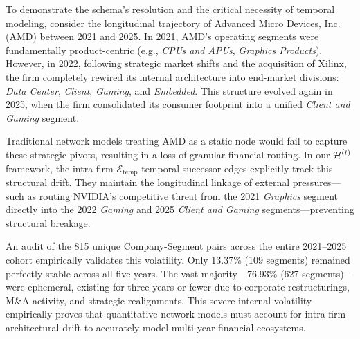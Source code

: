 To demonstrate the schema's resolution and the critical necessity of temporal modeling, consider the longitudinal trajectory of Advanced Micro Devices, Inc. (AMD) between 2021 and 2025. In 2021, AMD's operating segments were fundamentally product-centric (e.g., \textit{CPUs and APUs}, \textit{Graphics Products}). However, in 2022, following strategic market shifts and the acquisition of Xilinx, the firm completely rewired its internal architecture into end-market divisions: \textit{Data Center}, \textit{Client}, \textit{Gaming}, and \textit{Embedded}. This structure evolved again in 2025, when the firm consolidated its consumer footprint into a unified \textit{Client and Gaming} segment.

Traditional network models treating AMD as a static node would fail to capture these strategic pivots, resulting in a loss of granular financial routing. In our $\mathcal{H}^{(t)}$ framework, the intra-firm $\mathcal{E}_{\text{temp}}$ temporal successor edges explicitly track this structural drift. They maintain the longitudinal linkage of external pressures—such as routing NVIDIA's competitive threat from the 2021 \textit{Graphics} segment directly into the 2022 \textit{Gaming} and 2025 \textit{Client and Gaming} segments—preventing structural breakage. 

An audit of the 815 unique Company-Segment pairs across the entire 2021--2025 cohort empirically validates this volatility. Only 13.37\% (109 segments) remained perfectly stable across all five years. The vast majority---76.93\% (627 segments)---were ephemeral, existing for three years or fewer due to corporate restructurings, M\&A activity, and strategic realignments. This severe internal volatility empirically proves that quantitative network models must account for intra-firm architectural drift to accurately model multi-year financial ecosystems.